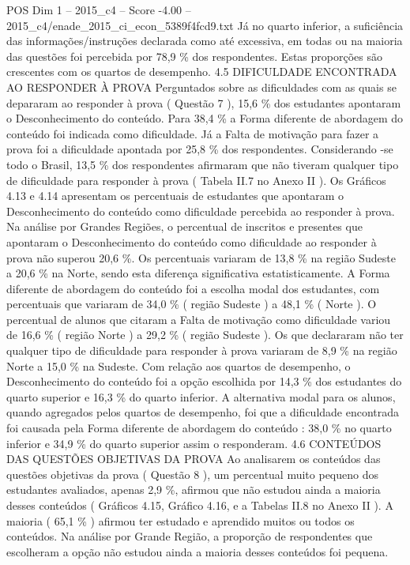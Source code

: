 \begin{textsample}{POS Dim 1 – 2015\_c4 – Score -4.00 – 2015\_c4/enade\_2015\_ci\_econ\_5389f4fcd9.txt}
Já no quarto inferior, a suficiência das informações/instruções declarada como até excessiva, em todas ou na maioria das questões foi percebida por 78,9 \% dos respondentes.
Estas proporções são crescentes com os quartos de desempenho. 4.5 DIFICULDADE ENCONTRADA AO RESPONDER À PROVA Perguntados sobre as dificuldades com as quais se depararam ao responder à prova ( Questão 7 ), 15,6 \% dos estudantes apontaram o Desconhecimento do conteúdo.
Para 38,4 \% a Forma diferente de abordagem do conteúdo foi indicada como dificuldade.
Já a Falta de motivação para fazer a prova foi a dificuldade apontada por 25,8 \% dos respondentes.
Considerando -se todo o Brasil, 13,5 \% dos respondentes afirmaram que não tiveram qualquer tipo de dificuldade para responder à prova ( Tabela II.7 no Anexo II ).
Os Gráficos 4.13 e 4.14 apresentam os percentuais de estudantes que apontaram o Desconhecimento do conteúdo como dificuldade percebida ao responder à prova.
Na análise por Grandes Regiões, o percentual de inscritos e presentes que apontaram o Desconhecimento do conteúdo como dificuldade ao responder à prova não superou 20,6 \%.
Os percentuais variaram de 13,8 \% na região Sudeste a 20,6 \% na Norte, sendo esta diferença significativa estatisticamente.
A Forma diferente de abordagem do conteúdo foi a escolha modal dos estudantes, com percentuais que variaram de 34,0 \% ( região Sudeste ) a 48,1 \% ( Norte ).
O percentual de alunos que citaram a Falta de motivação como dificuldade variou de 16,6 \% ( região Norte ) a 29,2 \% ( região Sudeste ).
Os que declararam não ter qualquer tipo de dificuldade para responder à prova variaram de 8,9 \% na região Norte a 15,0 \% na Sudeste.
Com relação aos quartos de desempenho, o Desconhecimento do conteúdo foi a opção escolhida por 14,3 \% dos estudantes do quarto superior e 16,3 \% do quarto inferior.
A alternativa modal para os alunos, quando agregados pelos quartos de desempenho, foi que a dificuldade encontrada foi causada pela Forma diferente de abordagem do conteúdo : 38,0 \% no quarto inferior e 34,9 \% do quarto superior assim o responderam. 4.6 CONTEÚDOS DAS QUESTÕES OBJETIVAS DA PROVA Ao analisarem os conteúdos das questões objetivas da prova ( Questão 8 ), um percentual muito pequeno dos estudantes avaliados, apenas 2,9 \%, afirmou que não estudou ainda a maioria desses conteúdos ( Gráficos 4.15, Gráfico 4.16, e a Tabelas II.8 no Anexo II ).
A maioria ( 65,1 \% ) afirmou ter estudado e aprendido muitos ou todos os conteúdos.
Na análise por Grande Região, a proporção de respondentes que escolheram a opção não estudou ainda a maioria desses conteúdos foi pequena.

\end{textsample}

